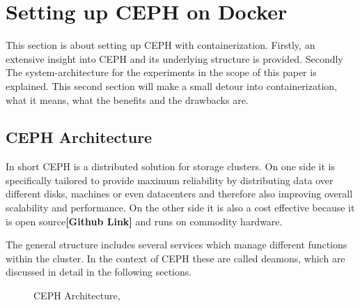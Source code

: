 \documentclass[titlepage, a4paper, 11pt]{scrartcl}
\begin{document}
    \section{Setting up CEPH on Docker}

        This section is about setting up CEPH with containerization. Firstly, an extensive insight into CEPH and its underlying
        structure is provided. Secondly The system-architecture for the experiments in the scope of this paper is explained.
        This second section will make a small detour into containerization, what it means, what the benefits and the drawbacks are.

        \subsection{CEPH Architecture}\label{ceph:arch}

            In short CEPH is a distributed solution for storage clusters. On one side it is specifically tailored to provide
            maximum reliability by distributing data over different disks, machines or even datacenters and therefore also 
            improving overall scalability and performance. On the other side it is also a cost effective because it is open source\textbf{[Github Link]}
            and runs on commodity hardware. 

            The general structure includes several services which manage different functions within the cluster. In the context of
            CEPH these are called deamons, which are discussed in detail in the following sections.

            \begin{figure}%
                \centering
                \caption{CEPH Architecture, \cite{hadlich_2015}}
                \label{fig:ceph-arch}
            \end{figure}
            
\end{document}
